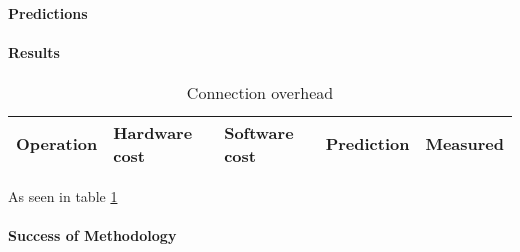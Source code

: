 \paragraph{Predictions}
\paragraph{Results}
\begin{table} [h]
\begin{center}
\begin{tabular}{| l | l | l | l | l |}
\hline
Operation & Hardware cost & Software cost & Prediction & Measured \\
\hline
\end{tabular}
\end{center}
\caption{Connection overhead\label{tab:connection-overhead}}
\end{table}

As seen in table \ref{tab:connection-overhead}

\paragraph{Success of Methodology}
